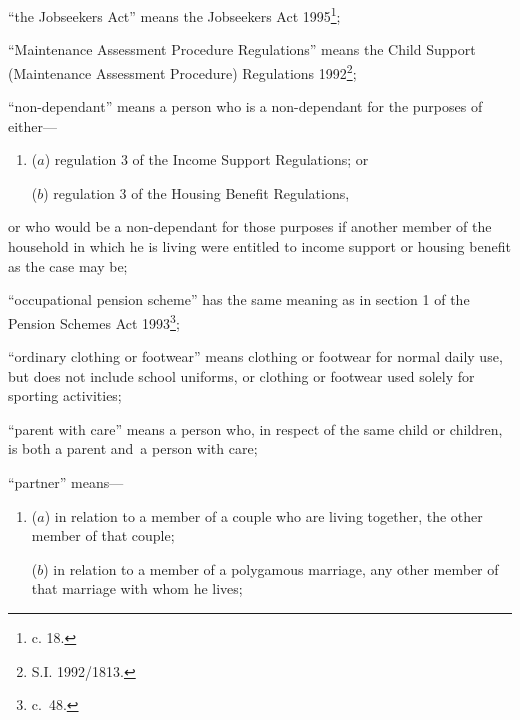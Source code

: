 \documentclass[12pt,a4paper]{article}
\begin{document}
\begin{enumerate}
“the Jobseekers Act” means the Jobseekers Act 1995\footnote{ c. 18.};

“Maintenance Assessment Procedure Regulations” means the Child Support (Maintenance Assessment Procedure) Regulations 1992\footnote{\frenchspacing S.I. 1992/1813.};


“non-dependant” means a person who is a non-dependant for the purposes of either—
\begin{enumerate}\item[]
($a$)
regulation 3 of the Income Support Regulations; or

($b$)
regulation 3 of the Housing Benefit Regulations,
\end{enumerate}
or who would be a non-dependant for those purposes if another member of the household in which he is living were entitled to income support or housing benefit as the case may be;


“occupational pension scheme” has the same meaning as in 
section 1 of the Pension Schemes Act 1993\footnote{ c.~48.};  %

“ordinary clothing or footwear” means clothing or footwear for normal daily use, but does not include school uniforms, or clothing or footwear used solely for sporting activities;

“parent with care” means a person who, in respect of the same child or children, is both a parent and~a person with care;

“partner” means—
\begin{enumerate}\item[]
($a$)
in relation to a member of 
a couple  %
who are living together, the other member of that couple;

($b$)
in relation to a member of a polygamous marriage, any other member of that marriage with whom he lives;
\end{enumerate}


\end{enumerate}
\end{document}
